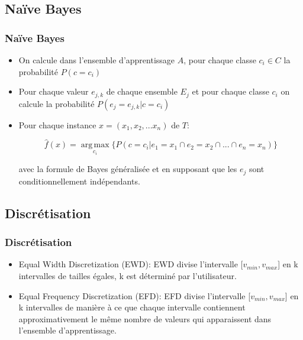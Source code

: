 	\subsection{Naïve Bayes}
	\begin{frame}
	\frametitle{Naïve Bayes}
	\begin{itemize}
	\item On calcule dans l'ensemble d'apprentissage $A$, pour chaque classe $c_{i}\in C$ la probabilité $P(c=c_{i})$
	\item Pour chaque valeur $e_{j,k}$ de chaque ensemble $E_{j}$ et pour chaque classe $c_{i}$ on calcule la probabilité $P(e_{j}=e_{j,k}|c=c_{i})$
	\item Pour chaque instance $x=(x_{1},x_{2},...x_{n})$ de $T$:
	\begin{center}
	\[\hat{f}(x)=\operatorname*{arg\,max}_{c_{i}} \lbrace P(c=c_{i}|e_{1}=x_{1}\cap e_{2}=x_{2}\cap ...\cap e_{n}=x_{n})\rbrace\]
	\end{center}
	avec la formule de Bayes généralisée et en supposant que les $e_{j}$ sont conditionnellement indépendants.
	\end{itemize}
	\end{frame}
	\subsection{Discrétisation}
	\begin{frame}
	\frametitle{Discrétisation}
	\begin{itemize}
		\item Equal Width Discretization (EWD):
		EWD divise l'intervalle [$ v_{min},v_{max} $] en k intervalles de tailles égales, k est déterminé par l'utilisateur.\

		\item Equal Frequency Discretization (EFD):
		EFD divise l'intervalle [$v_{min},v_{max} $] en k intervalles de manière à ce que chaque intervalle contiennent approximativement le même nombre de valeurs qui apparaissent dans l'ensemble d'apprentissage.
	\end{itemize}
	\end{frame}
	